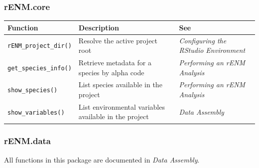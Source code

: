 \documentclass[
  letterpaper,
  DIV=11,
  numbers=noendperiod]{scrartcl}
\newcounter{none} %
\begin{document}
\subsubsection{rENM.core}\label{renm.core}

{\def\LTcaptype{none} %
\begin{longtable}[]{@{}
  >{\raggedright\arraybackslash}p{}
  >{\raggedright\arraybackslash}p{}
  >{\raggedright\arraybackslash}p{}@{}}
\toprule\noalign{}
\begin{minipage}[b]{\linewidth}\raggedright
Function
\end{minipage} & \begin{minipage}[b]{\linewidth}\raggedright
Description
\end{minipage} & \begin{minipage}[b]{\linewidth}\raggedright
See
\end{minipage} \\
\midrule\noalign{}
\endhead
\bottomrule\noalign{}
\endlastfoot
\texttt{rENM\_project\_dir()} & Resolve the active project root &
\emph{Configuring the RStudio Environment} \\
\texttt{get\_species\_info()} & Retrieve metadata for a species by alpha
code & \emph{Performing an rENM Analysis} \\
\texttt{show\_species()} & List species available in the project &
\emph{Performing an rENM Analysis} \\
\texttt{show\_variables()} & List environmental variables available in
the project & \emph{Data Assembly} \\
\end{longtable}
}

\subsubsection{rENM.data}\label{renm.data}

All functions in this package are documented in \emph{Data Assembly}.
\end{document}
